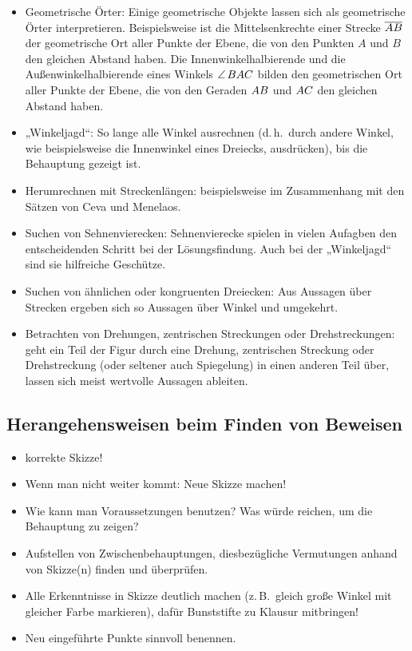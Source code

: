 \documentclass[11pt,a4paper]{article}
\begin{document}
\begin{itemize}
\item Geometrische Örter: Einige geometrische Objekte lassen sich als
  geometrische Örter interpretieren. Beispielsweise ist die Mittelsenkrechte
  einer Strecke $\overline{{\mathnormal{AB}}}$ der geometrische Ort aller Punkte der Ebene,
  die von den Punkten $A$ und $B$ den gleichen Abstand haben. Die
  Innenwinkelhalbierende und die Außenwinkelhalbierende eines Winkels
  $\kangle{BAC}$ bilden den geometrischen Ort aller Punkte der Ebene, die von
  den Geraden ${\mathnormal{AB}}$ und ${\mathnormal{AC}}$ den gleichen Abstand haben.
\item „Winkeljagd“: So lange alle Winkel ausrechnen (d.\,h.\ durch andere
  Winkel, wie beispielsweise die Innenwinkel eines Dreiecks, ausdrücken), bis
  die Behauptung gezeigt ist.
\item Herumrechnen mit Streckenlängen: beispielsweise im Zusammenhang mit den
  Sätzen von Ceva und Menelaos.
\item Suchen von Sehnenvierecken: Sehnenvierecke spielen in vielen Aufagben
  den entscheidenden Schritt bei der Lösungsfindung. Auch bei der „Winkeljagd“
  sind sie hilfreiche Geschütze.
\item Suchen von ähnlichen oder kongruenten Dreiecken: Aus Aussagen über
  Strecken ergeben sich so Aussagen über Winkel und umgekehrt.
\item Betrachten von Drehungen, zentrischen Streckungen oder Drehstreckungen:
  geht ein Teil der Figur durch eine Drehung, zentrischen Streckung oder
  Drehstreckung (oder seltener auch Spiegelung) in einen anderen Teil über,
  lassen sich meist wertvolle Aussagen ableiten.
\end{itemize}

\subsection{Herangehensweisen beim Finden von Beweisen}

\begin{itemize}
\item korrekte Skizze!
\item Wenn man nicht weiter kommt: Neue Skizze machen!
\item Wie kann man Voraussetzungen benutzen? Was würde reichen, um die
  Behauptung zu zeigen?
\item Aufstellen von Zwischenbehauptungen, diesbezügliche Vermutungen anhand
  von Skizze(n) finden und überprüfen.
\item Alle Erkenntnisse in Skizze deutlich machen (z.\,B.\ gleich große Winkel
  mit gleicher Farbe markieren), dafür Bunststifte zu Klausur mitbringen!
\item Neu eingeführte Punkte sinnvoll benennen.
\end{itemize}
\end{document}
